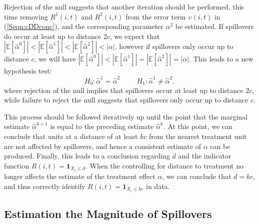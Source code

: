 \documentclass{article}
\begin{document}
\begin{spacing}{1.1}
Rejection of the null suggests that another iteration should be performed, this time
removing $R^1(i,t)$ and $R^2(i,t)$ from the error term $\upsilon(i,t)$ in 
(\ref{Seqn:cDDconc}), and the corresponding 
parameter $\alpha^2$ be estimated.  If spillovers do occur at least up to distance 
$2c$, we expect that $|\mathbb{E}[\hat\alpha^0]|<|\mathbb{E}[\hat\alpha^1]|<
|\mathbb{E}[\hat\alpha^2]|<|\alpha|$, however if spillovers only occur up to distance
$c$, we will have $|\mathbb{E}[\hat\alpha^0]|<|\mathbb{E}[\hat\alpha^1]|=
|\mathbb{E}[\hat\alpha^2]|=|\alpha|$.  This leads to a new hypothesis test:
\[
H_0: \hat\alpha^1=\hat\alpha^2 \hspace{1cm}
H_1: \hat\alpha^1\neq\hat\alpha^2,
\]
where rejection of the null implies that spillovers occur at least up to distance
$2c$, while failure to reject the null suggests that spillovers only occur up to 
distance $c$.

This process should be followed iteratively up until the point that the marginal 
estimate $\hat\alpha^{k+1}$ is equal to the preceding estimate $\hat\alpha^{k}$.  At
this point, we can conclude that units at a distance of at least $kc$ from the 
nearest treatment unit are not affected by spillovers, and hence a consistent 
estimate of $\alpha$ can be produced.  Finally, this leads to a conclusion regarding
$d$ and the indicator function $R(i,t)=\mathbf{1}_{X_i\leq d}$.  When the controlling
for distance to treatment no longer affects the estimate of the treatment effect
$\alpha$, we can conclude that $d=kc$, and thus correctly identify 
$R(i,t)=\mathbf{1}_{X_i\leq kc}$ in data.










\subsection{Estimation the Magnitude of Spillovers}


\end{spacing}
\end{document}
